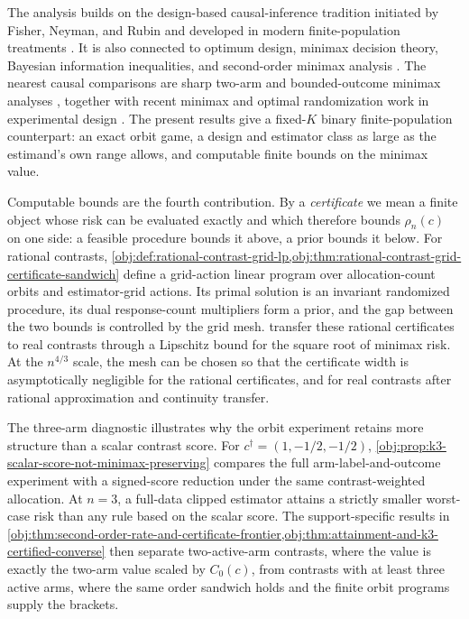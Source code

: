 \documentclass[11pt]{article}
\begin{document}
The analysis builds on the design-based causal-inference tradition initiated by Fisher, Neyman, and Rubin and developed in modern finite-population treatments \citep{fisher_1935,neyman_1990,rubin_1974,rubin_1978,holland_1986,imbens_rubin_2015,imbens_wooldridge_2009,athey_imbens_2017,ding_2024}. It is also connected to optimum design, minimax decision theory, Bayesian information inequalities, and second-order minimax analysis \citep{smith_1918,kiefer_1959,kiefer_1974,atkinson_2007,wald_1950,lecam_1986,ibragimov_1981,rao_1945,van_trees_1968,gill_1995,levit_1981_second_order,bickel_1981,pinsker_1980,johnstone_1992}. The nearest causal comparisons are sharp two-arm and bounded-outcome minimax analyses \citep{sudijono_dobriban_tchetgen_2026_sharp,hull_2026_bounded}, together with recent minimax and optimal randomization work in experimental design \citep{kallus_2018,kallus_2020_optimality,bai_2023_why,harshaw_2024,basse_2023,derezinski_2019,hu_2024,kandiros_2024,kandiros_2026}. The present results give a fixed-\(K\) binary finite-population counterpart: an exact orbit game, a design and estimator class as large as the estimand's own range allows, and computable finite bounds on the minimax value.

Computable bounds are the fourth contribution. By a \emph{certificate} we mean a finite object whose risk can be evaluated exactly and which therefore bounds \(\rho_n(c)\) on one side: a feasible procedure bounds it above, a prior bounds it below. For rational contrasts, \cref{obj:def:rational-contrast-grid-lp,obj:thm:rational-contrast-grid-certificate-sandwich} define a grid-action linear program over allocation-count orbits and estimator-grid actions. Its primal solution is an invariant randomized procedure, its dual response-count multipliers form a prior, and the gap between the two bounds is controlled by the grid mesh.  transfer these rational certificates to real contrasts through a Lipschitz bound for the square root of minimax risk. At the \(n^{4/3}\) scale, the mesh can be chosen so that the certificate width is asymptotically negligible for the rational certificates, and for real contrasts after rational approximation and continuity transfer.

The three-arm diagnostic illustrates why the orbit experiment retains more structure than a scalar contrast score. For \(c^\dagger=(1,-1/2,-1/2)\), \cref{obj:prop:k3-scalar-score-not-minimax-preserving} compares the full arm-label-and-outcome experiment with a signed-score reduction under the same contrast-weighted allocation. At \(n=3\), a full-data clipped estimator attains a strictly smaller worst-case risk than any rule based on the scalar score. The support-specific results in \cref{obj:thm:second-order-rate-and-certificate-frontier,obj:thm:attainment-and-k3-certified-converse} then separate two-active-arm contrasts, where the value is exactly the two-arm value scaled by \(C_0(c)\), from contrasts with at least three active arms, where the same order sandwich holds and the finite orbit programs supply the brackets.
\end{document}
